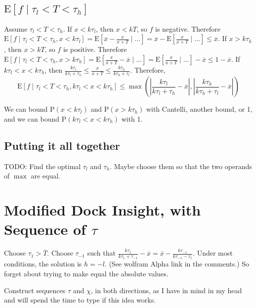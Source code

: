 \documentclass{article}
\newcommand \E[1] {\mathrm E \left[#1\right]} %
\newcommand \p[1] {\mathrm P \left(#1\right)}
\begin{document}
\subsection{$\E{f\mid \tau_l<T<\tau_h}$}

Assume $\tau_l<T<\tau_h$. If $x<k\tau_l$, then $x<kT$, so $f$ is negative. Therefore $\E{f\mid \tau_l<T<\tau_h, x<k\tau_l} = \E{\overline x - \frac{x}{x+T} \mid\ldots} = \overline x - \E{\frac{x}{x+T} \mid\ldots} \leq \overline x$. If $x>k\tau_h$, then $x>kT$, so $f$ is positive. Therefore $\E{f\mid \tau_l<T<\tau_h, x>k\tau_h} = \E{\frac{x}{x+T}-\overline x \mid\ldots} = \E{\frac{x}{x+T} \mid\ldots} - \overline x \leq 1-\overline x$. If $k\tau_l < x < k\tau_h$, then $\frac{k\tau_l}{k\tau_l + \tau_h}  \leq \frac{x}{x+T} \leq \frac{k\tau_h}{k\tau_h + \tau_l}$. Therefore,
\begin{equation*}
\E{f\mid \tau_l<T<\tau_h, k\tau_l<x<k\tau_h} \leq \max\left(\left|\frac{k\tau_l}{k\tau_l + \tau_h}-\overline x\right|, \left|\frac{k\tau_h}{k\tau_h + \tau_l}-\overline x\right|\right)
\end{equation*}

We can bound $\p{x<k\tau_l}$ and $\p{x>k\tau_h}$ with Cantelli, another bound, or 1, and we can bound $\p{k\tau_l<x<k\tau_h}$ with 1.

\subsection{Putting it all together}

TODO: Find the optimal $\tau_l$ and $\tau_h$. Maybe choose them so that the two operands of $\max$ are equal.


\section{Modified Dock Insight, with Sequence of $\tau$}


Choose $\tau_1 > \overline T$. Choose $\tau_{-1}$ such that $\frac{k\tau_1}{k\tau_1+\tau_{-1}} - \overline x = \overline x - \frac{k\tau_{-1}}{k\tau_{-1}-\tau_1}$. Under most conditions, the solution is $h=-l$. (See wolfram Alpha link in the comments.) So forget about trying to make equal the absolute values.

Construct sequences $\tau$ and $\chi$, in both directions, as I have in mind in my head and will spend the time to type if this idea works.
\end{document}
